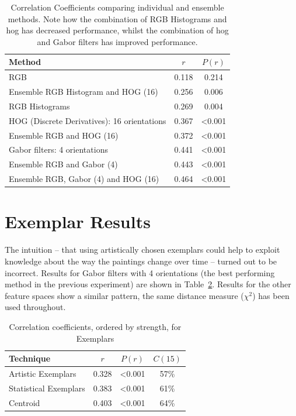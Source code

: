 \begin{table}[h]
\centering
\begin{tabular}{|l|c|c|}\hline
Method	& $r$	& $P(r)$ \\ \hline
RGB 						& 0.118  & 0.214 \\
Ensemble RGB Histogram and HOG (16)		& 0.256 & 0.006 \\
RGB Histograms					& 0.269 & 0.004 \\
HOG (Discrete Derivatives): 16 orientations	& 0.367 & \textless0.001 \\
Ensemble RGB and HOG (16)			& 0.372 & \textless0.001 \\
Gabor filters: 4 orientations			& 0.441 & \textless0.001 \\
Ensemble RGB and Gabor (4)			& 0.443	& \textless0.001 \\
Ensemble RGB, Gabor (4) and HOG (16)		& 0.464	& \textless0.001 \\
\hline
\end{tabular}
\caption[Correlation Coefficients comparing individual and ensemble methods]{Correlation Coefficients comparing individual and ensemble methods. Note how the 
combination of RGB Histograms and \gls{hog} has decreased performance, whilst the combination of
\gls{hog} and Gabor filters has improved performance.}\label{tab:ensemble-results}
\end{table}

\newpage
\section{Exemplar Results}
The intuition -- that using artistically chosen exemplars could help to exploit knowledge about 
the way the paintings change over time -- turned out to be incorrect. Results for Gabor filters 
with 4 orientations (the best performing method in the previous experiment) are shown in 
Table~\ref{artistic_exemplars}.  Results for the other feature spaces show a similar pattern, the 
same distance measure ($\chi^2$) has been used throughout. 

\begin{table}[h]
\centering
\begin{tabular}{|p{3.5cm}|c|c|c|}
\hline
Technique     & $r$ & $P(r)$ & $C(15)$ \\ \hline
Artistic Exemplars	& 0.328	& \textless0.001 & 57\%\\
Statistical Exemplars	& 0.383	& \textless0.001 & 61\%\\
Centroid		& 0.403	& \textless0.001 & 64\%\\
\hline
\end{tabular}
\vspace{0.5em}
\caption{Correlation coefficients, ordered by strength, for Exemplars
\label{artistic_exemplars}}
\end{table}

